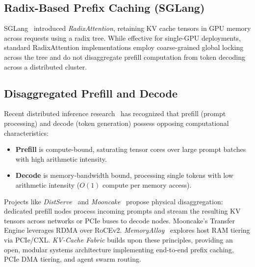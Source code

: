 \documentclass[10pt,twocolumn,letterpaper]{article}
\begin{document}
\subsection{Radix-Based Prefix Caching (SGLang)}
SGLang~\cite{zheng2023sglang} introduced \textit{RadixAttention}, retaining KV cache tensors in GPU memory across requests using a radix tree. While effective for single-GPU deployments, standard RadixAttention implementations employ coarse-grained global locking across the tree and do not disaggregate prefill computation from token decoding across a distributed cluster.

\subsection{Disaggregated Prefill and Decode}
Recent distributed inference research~\cite{zhong2024distserve, mooncake2024, agrawal2024sarathi, patel2024splitwise} has recognized that prefill (prompt processing) and decode (token generation) possess opposing computational characteristics:
\begin{itemize}
    \item \textbf{Prefill} is compute-bound, saturating tensor cores over large prompt batches with high arithmetic intensity.
    \item \textbf{Decode} is memory-bandwidth bound, processing single tokens with low arithmetic intensity ($O(1)$ compute per memory access).
\end{itemize}
Projects like \textit{DistServe}~\cite{zhong2024distserve} and \textit{Mooncake}~\cite{mooncake2024} propose physical disaggregation: dedicated prefill nodes process incoming prompts and stream the resulting KV tensors across networks or PCIe buses to decode nodes. Mooncake's Transfer Engine leverages RDMA over RoCEv2. \textit{MemoryAlloy}~\cite{crusoe2025memoryalloy} explores host RAM tiering via PCIe/CXL. \textit{KV-Cache Fabric} builds upon these principles, providing an open, modular systems architecture implementing end-to-end prefix caching, PCIe DMA tiering, and agent swarm routing.
\end{document}
